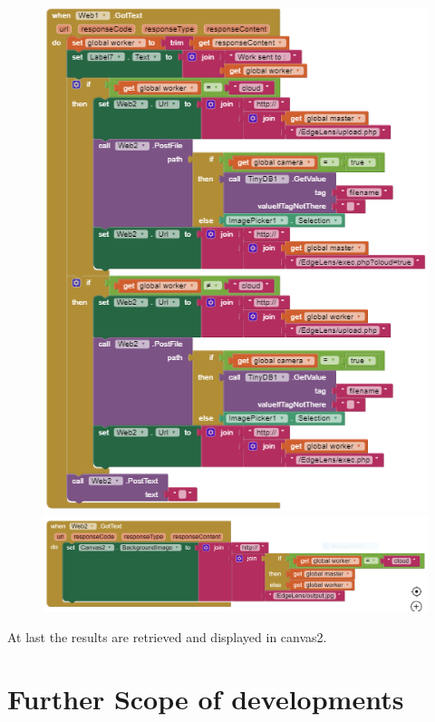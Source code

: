\documentclass{article}
\begin{document}
\begin{figure}[H]
\centering %
\includegraphics[width=\textwidth]{3.PNG}
\includegraphics[width=\textwidth]{4.PNG}
\end{figure}

At last the results are retrieved and displayed in canvas2.

\newpage
\newpage


\section{Further Scope of developments}
\end{document}
